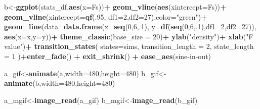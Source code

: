 \documentclass[
]{book}
\newenvironment{Shaded}{\begin{snugshade}}{\end{snugshade}}
\newcommand{\AttributeTok}[1]{\textcolor[rgb]{0.13,0.29,0.53}{#1}}
\newcommand{\DecValTok}[1]{\textcolor[rgb]{0.00,0.00,0.81}{#1}}
\newcommand{\FunctionTok}[1]{\textcolor[rgb]{0.13,0.29,0.53}{\textbf{#1}}}
\newcommand{\NormalTok}[1]{#1}
\newcommand{\OtherTok}[1]{\textcolor[rgb]{0.56,0.35,0.01}{#1}}
\newcommand{\SpecialCharTok}[1]{\textcolor[rgb]{0.81,0.36,0.00}{\textbf{#1}}}
\newcommand{\StringTok}[1]{\textcolor[rgb]{0.31,0.60,0.02}{#1}}
\begin{document}
\begin{Shaded}
\begin{Highlighting}[]
\NormalTok{b}\OtherTok{\textless{}{-}}\FunctionTok{ggplot}\NormalTok{(stats\_df,}\FunctionTok{aes}\NormalTok{(}\AttributeTok{x=}\NormalTok{Fs))}\SpecialCharTok{+}
  \FunctionTok{geom\_vline}\NormalTok{(}\FunctionTok{aes}\NormalTok{(}\AttributeTok{xintercept=}\NormalTok{Fs))}\SpecialCharTok{+}
  \FunctionTok{geom\_vline}\NormalTok{(}\AttributeTok{xintercept=}\FunctionTok{qf}\NormalTok{(.}\DecValTok{95}\NormalTok{, }\AttributeTok{df1=}\DecValTok{2}\NormalTok{,}\AttributeTok{df2=}\DecValTok{27}\NormalTok{),}\AttributeTok{color=}\StringTok{"green"}\NormalTok{)}\SpecialCharTok{+}
  \FunctionTok{geom\_line}\NormalTok{(}\AttributeTok{data=}\FunctionTok{data.frame}\NormalTok{(}\AttributeTok{x=}\FunctionTok{seq}\NormalTok{(}\DecValTok{0}\NormalTok{,}\DecValTok{6}\NormalTok{,.}\DecValTok{1}\NormalTok{),}
                            \AttributeTok{y=}\FunctionTok{df}\NormalTok{(}\FunctionTok{seq}\NormalTok{(}\DecValTok{0}\NormalTok{,}\DecValTok{6}\NormalTok{,.}\DecValTok{1}\NormalTok{),}\AttributeTok{df1=}\DecValTok{2}\NormalTok{,}\AttributeTok{df2=}\DecValTok{27}\NormalTok{)),}
            \FunctionTok{aes}\NormalTok{(}\AttributeTok{x=}\NormalTok{x,}\AttributeTok{y=}\NormalTok{y))}\SpecialCharTok{+}
  \FunctionTok{theme\_classic}\NormalTok{(}\AttributeTok{base\_size =} \DecValTok{20}\NormalTok{)}\SpecialCharTok{+}
  \FunctionTok{ylab}\NormalTok{(}\StringTok{"density"}\NormalTok{)}\SpecialCharTok{+}
  \FunctionTok{xlab}\NormalTok{(}\StringTok{"F value"}\NormalTok{)}\SpecialCharTok{+}
  \FunctionTok{transition\_states}\NormalTok{(}
    \AttributeTok{states=}\NormalTok{sims,}
    \AttributeTok{transition\_length =} \DecValTok{2}\NormalTok{,}
    \AttributeTok{state\_length =} \DecValTok{1}
\NormalTok{  )}\SpecialCharTok{+}\FunctionTok{enter\_fade}\NormalTok{() }\SpecialCharTok{+} 
  \FunctionTok{exit\_shrink}\NormalTok{() }\SpecialCharTok{+}
  \FunctionTok{ease\_aes}\NormalTok{(}\StringTok{\textquotesingle{}sine{-}in{-}out\textquotesingle{}}\NormalTok{)}

\NormalTok{a\_gif}\OtherTok{\textless{}{-}}\FunctionTok{animate}\NormalTok{(a,}\AttributeTok{width=}\DecValTok{480}\NormalTok{,}\AttributeTok{height=}\DecValTok{480}\NormalTok{)}
\NormalTok{b\_gif}\OtherTok{\textless{}{-}}\FunctionTok{animate}\NormalTok{(b,}\AttributeTok{width=}\DecValTok{480}\NormalTok{,}\AttributeTok{height=}\DecValTok{480}\NormalTok{)}

\NormalTok{a\_mgif}\OtherTok{\textless{}{-}}\FunctionTok{image\_read}\NormalTok{(a\_gif)}
\NormalTok{b\_mgif}\OtherTok{\textless{}{-}}\FunctionTok{image\_read}\NormalTok{(b\_gif)}


\end{Highlighting}
\end{Shaded}
\end{document}
